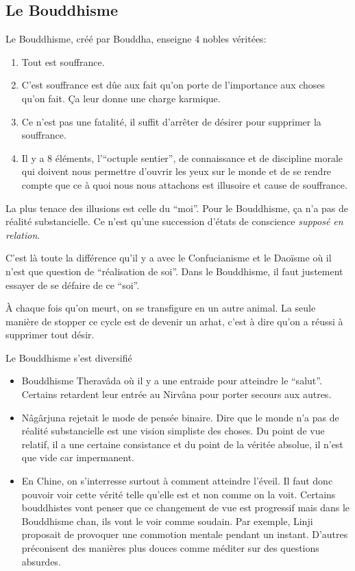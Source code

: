 \subsection{Le Bouddhisme}
Le Bouddhisme, créé par Bouddha, enseigne 4 nobles véritées:
\begin{enumerate}
	\item Tout est souffrance.
	\item C'est souffrance est dûe aux fait qu'on porte de l'importance aux choses qu'on fait.
		Ça leur donne une charge karmique.
	\item Ce n'est pas une fatalité, il suffit d'arrêter de désirer pour supprimer la souffrance.
	\item Il y a 8 éléments, l'``octuple sentier'',
		de connaissance et de discipline morale qui doivent nous permettre d'ouvrir les yeux sur le monde et de se rendre compte que ce à quoi nous nous attachons est illusoire et cause de souffrance.
\end{enumerate}
La plus tenace des illusions est celle du ``moi''.
Pour le Bouddhisme, ça n'a pas de réalité substancielle.
Ce n'est qu'une succession d'états de conscience \emph{supposé en relation}.

C'est là toute la différence qu'il y a avec le Confucianisme et le Daoïsme où il n'est que question de ``réalisation de soi''.
Dans le Bouddhisme, il faut justement essayer de se défaire de ce ``soi''.

À chaque fois qu'on meurt, on se transfigure en un autre animal.
La seule manière de stopper ce cycle est de devenir un arhat, c'est à dire qu'on a réussi à supprimer tout désir.

Le Bouddhisme s'est diversifié
\begin{itemize}
	\item Bouddhisme Theravâda où il y a une entraide pour atteindre le ``salut''.
		Certains retardent leur entrée au Nirvâna pour porter secours aux autres.
	\item Nâgârjuna rejetait le mode de pensée binaire.
		Dire que le monde n'a pas de réalité substancielle est une vision simpliste des choses.
		Du point de vue relatif, il a une certaine consistance et du point de la véritée absolue, il n'est que vide car impermanent.
	\item En Chine, on s'interresse surtout à comment atteindre l'éveil.
		Il faut donc pouvoir voir cette vérité telle qu'elle est et non comme on la voit.
		Certains bouddhistes vont penser que ce changement de vue est progressif mais dans le Bouddhisme chan, ils vont le voir comme soudain.
		Par exemple, Linji proposait de provoquer une commotion mentale pendant un instant.
		D'autres préconisent des manières plus douces comme méditer sur des questions absurdes.
\end{itemize}

